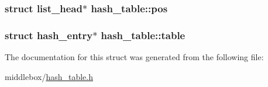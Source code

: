 \hypertarget{structhash__table_af971de29e1c0b18ae5dede92ac65645d}{
\subsubsection[{pos}]{\setlength{\rightskip}{0pt plus 5cm}struct list\-\_\-head$\ast$ hash\-\_\-table\-::pos}}\label{structhash__table_af971de29e1c0b18ae5dede92ac65645d}
\hypertarget{structhash__table_a8d603d6d232203d2e491b58c9c6dabc5}{
\subsubsection[{table}]{\setlength{\rightskip}{0pt plus 5cm}struct {\bf hash\-\_\-entry}$\ast$ hash\-\_\-table\-::table}}\label{structhash__table_a8d603d6d232203d2e491b58c9c6dabc5}


The documentation for this struct was generated from the following file\-:\begin{DoxyCompactItemize}
\item 
middlebox/\hyperlink{hash__table_8h}{hash\-\_\-table.\-h}\end{DoxyCompactItemize}

